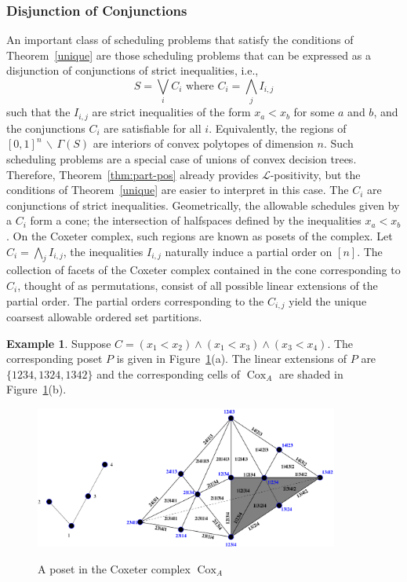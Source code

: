 \documentclass[12pt,reqno]{amsart}
\numberwithin{definition}{section}
\theoremstyle{definition}
\newtheorem{example}[definition]{Example}
\newcommand{\cox}{\operatorname{Cox}}
\newcommand{\ncL}{\mathcal{L}}
\newcommand{\forb}{\Gamma} %
\begin{document}
\subsubsection{Disjunction of Conjunctions}
An important class of scheduling problems that satisfy the conditions of Theorem~\ref{unique} are those scheduling problems that can be expressed as a disjunction of conjunctions of strict inequalities, i.e.,
\[
  S = \bigvee_i C_i \text{ where } C_i = \bigwedge_j I_{i,j}
\] \label{posets}
such that the $I_{i,j}$ are strict inequalities of the form $x_a <
x_b$ for some $a$ and $b$, and the conjunctions $C_i$ are satisfiable
for all $i$.  Equivalently, the regions of $[0,1]^n \, \backslash \,
\forb(S)$ are interiors of convex polytopes of dimension $n$.  Such
scheduling problems are a special case of unions of  convex
decision trees.  Therefore, Theorem~\ref{thm:part-pos} already
provides $\ncL$-positivity, but the conditions of
Theorem~\ref{unique} are easier to interpret in this case.  The
$C_i$ are conjunctions of strict inequalities. Geometrically, the
allowable schedules given by a $C_i$ form a cone; the intersection of
halfspaces defined by the inequalities $x_a < x_b$.  On the Coxeter
complex, such regions are known as posets of the complex.  Let $C_i =
\bigwedge_j I_{i,j}$, the inequalities $I_{i,j}$ naturally induce a
partial order on $[n]$.  The collection of facets of the Coxeter
complex contained in the cone corresponding to $C_i$, thought of as
permutations, consist of all possible linear extensions of the partial
order.  The partial orders corresponding to the $C_{i,j}$ yield the unique coarsest allowable ordered set partitions.


\begin{example}
Suppose $C = (x_1 < x_2) \wedge (x_1 < x_3) \wedge (x_3 < x_4)$.  The corresponding poset $P$ is given in Figure~\ref{fig:poset}(a).  The linear extensions of $P$ are $\{1234, 1324, 1342\}$ and the corresponding cells of $\cox_A$ are shaded in Figure~\ref{fig:poset}(b).
\end{example}


\begin{figure}[h]
\includegraphics[width=10cm]{poset.pdf}
\label{fig:poset}
\caption{A poset in the Coxeter complex $\cox_A$}
\end{figure}
\end{document}

